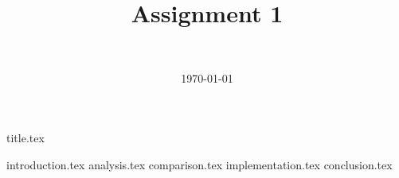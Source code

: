 \documentclass[final]{report}
\title{Assignment 1}
\author{~}
\date{\today}
\begin{document}

{title.tex}
\newpage
\tableofcontents

\newpage
{}
{introduction.tex}
\newpage
{analysis.tex}
{comparison.tex}
{implementation.tex}
{conclusion.tex}

\end{document}
